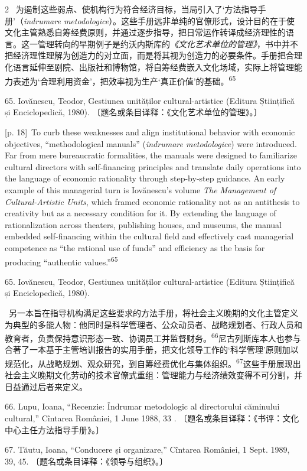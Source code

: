 \documentclass[10pt,a4paper]{article}
\begin{document}
\begin{paracol}{2}
\switchcolumn*
{\scriptsize\color{gray} [p. 18]}\ 为遏制这些弱点、使机构行为符合经济目标，当局引入了‘方法指导手册’（\textit{îndrumare metodologice}）。这些手册远非单纯的官僚形式，设计目的在于使文化主管熟悉自筹经费原则，并通过逐步指导，把日常运作转译成经济理性的语言。这一管理转向的早期例子是约沃内斯库的\textit{《文化艺术单位的管理》}，书中并不把经济理性理解为创造力的对立面，而是将其视为创造力的必要条件。手册把合理化语言延伸至剧院、出版社和博物馆，将自筹经费嵌入文化场域，实际上将管理能力表述为‘合理利用资金’，把效率视为生产‘真正价值’的基\mbox{础。\textsuperscript{65}}\par{\small 65. Iovănescu, Teodor, Gestiunea unităților cultural-artistice (Editura Științifică și Enciclopedică, 1980). 〔题名或条目译释：《文化艺术单位的管理》。〕\par}
\switchcolumn
{\scriptsize\color{gray} [p. 18]}\ To curb these weaknesses and align institutional behavior with economic objectives, “methodological manuals” (\textit{îndrumare metodologice}) were introduced. Far from mere bureaucratic formalities, the manuals were designed to familiarize cultural directors with self-financing principles and translate daily operations into the language of economic rationality through step-by-step guidance. An early example of this managerial turn is Iovănescu’s volume \textit{The Management of Cultural-Artistic Units}, which framed economic rationality not as an antithesis to creativity but as a necessary condition for it. By extending the language of rationalization across theaters, publishing houses, and museums, the manual embedded self-financing within the cultural field and effectively cast managerial competence as “the rational use of funds” and efficiency as the basis for producing “authentic values.”\nobreak\textsuperscript{65}\par{\small 65. Iovănescu, Teodor, Gestiunea unităților cultural-artistice (Editura Științifică și Enciclopedică, 1980).\par}
\switchcolumn*
{\scriptsize\color{gray} [p. 18]}\ 另一本旨在指导机构满足这些要求的方法手册，将社会主义晚期的文化主管定义为典型的多能人物：他同时是科学管理者、公众动员者、战略规划者、行政人员和教育者，负责保持意识形态一致、协调员工并监督财\mbox{务。\textsuperscript{66}}尼古列斯库本人也参与合著了一本基于主管培训报告的实用手册，把文化领导工作的‘科学管理’原则加以规范化，从战略规划、观众研究，到自筹经费优化与集体组\mbox{织。\textsuperscript{67}}这些手册展现出社会主义晚期文化劳动的技术官僚式重组：管理能力与经济绩效变得不可分割，并日益通过后者来定义。\par{\small 66. Lupu, Ioana, “Recenzie: Îndrumar metodologic al directorului căminului cultural,” Cîntarea României, 1 June 1988, 33 . 〔题名或条目译释：《书评：文化中心主任方法指导手册》。〕\par}{\small 67. Tăutu, Ioana, “Conducere și organizare,” Cîntarea României, 1 Sept. 1989, 39, 45. 〔题名或条目译释：《领导与组织》。〕\par}

\end{paracol}
\end{document}
